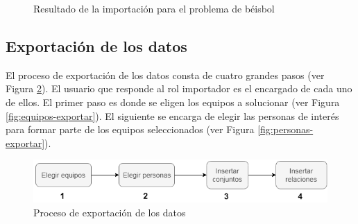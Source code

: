 \begin{figure} [H]
	\centering
	
	\caption{Resultado de la importación para el problema de béisbol} \label{fig:import-comp-tec}
\end{figure}

\subsection{Exportación de los datos}

El proceso de exportación de los datos consta de cuatro grandes pasos (ver Figura \ref{fig:proceso-export}). El usuario que responde al rol importador es el encargado de cada uno de ellos. El primer paso es donde se eligen los equipos a solucionar (ver Figura \ref{fig:equipos-exportar}). El siguiente se encarga de elegir las personas de interés para formar parte de los equipos seleccionados (ver Figura \ref{fig:personas-exportar}).

\begin{figure}[H]
	\centering
	\includegraphics[width=1\textwidth]{figuras/flujoExport.png}
	\caption{Proceso de exportación de los datos}\label{fig:proceso-export}
\end{figure} 


